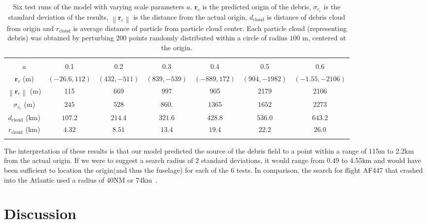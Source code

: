 \documentclass[pre,12pt]{revtex4-1}
\begin{document}
\begin{table}[h]
\label{Convergence}
\centering
\begin{tabular}{@{}CCCCCCc@{}}
\toprule
{} &  &  &  &   &  &  \\
\colrule
{} $a$ & 0.1 & 0.2 & 0.3 & 0.4 & 0.5 &  0.6\\
$\mathbf{r}_c$ (m) & $(-26.6,112)$ & $(432,-511)$ &  $(839, -539)$ & $(-889,172)$ & $(904,-1982)$ & $(-1.55,-2106)$\\
 $\left\lVert\mathbf{r}_c\right\rVert$ (m) & 115 & 669 &  997 & 905 & 2179 & 2106\\
$\sigma_{r_c}$ (m) & $245$ & $528$ &  $860.$ & $1365$ & $1652$ & $2273$\\
 $d_\text{cloud}$ (km) & $107.2$ & $214.4$ & $321.6$ & $428.8$ & $536.0$ & $643.2$\\
$r_\text{cloud}$ (km) & $4.32$ & $8.51$ & $13.4$ & $19.4$ & $22.2$ & $26.0$\\
\botrule
\end{tabular}
\caption{Six test runs of the model with varying scale parameters $a$. $\mathbf{r}_c$ is the predicted origin of the debris, $\sigma_{r_c}$ is the standard deviation of the results, $\left\lVert\mathbf{r}_c\right\rVert$ is the distance from the actual origin, $d_\text{cloud}$ is distance of debris cloud from origin and $r_\text{cloud}$ is average distance of particle from particle cloud center. Each particle cloud (representing debris) was obtained by perturbing 200 points randomly distributed within a circle of radius $100$ m, centered at the origin.}
\end{table}
The interpretation of these results is that our model predicted the source of the debris field to a point within a range of 115m to 2.2km from the actual origin. If we were to suggest a search radius of 2 standard deviations, it would range from 0.49 to 4.55km and would have been sufficient to location the origin(and thus the fuselage) for each of the 6 tests. In comparison, the search for flight AF447 that crashed into the Atlantic used a radius of 40NM or 74km~\cite{MetronAnalysis}.



\section{Discussion}\label{Discussion}
\end{document}
